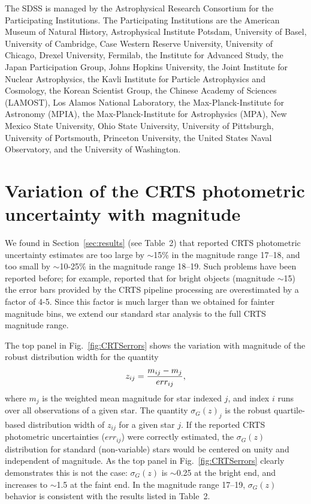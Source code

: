\documentclass[fleqn,usenatbib]{mnras}  %
\begin{document}
The SDSS is managed by the Astrophysical Research Consortium for the Participating Institutions. 
The Participating Institutions are the American Museum of Natural History, Astrophysical Institute 
Potsdam, University of Basel, University of Cambridge, Case Western Reserve University, University
of Chicago, Drexel University, Fermilab, the Institute for Advanced Study, the Japan Participation 
Group, Johns Hopkins University, the Joint Institute for Nuclear Astrophysics, the Kavli Institute for 
Particle Astrophysics and Cosmology, the Korean Scientist Group, the Chinese Academy of Sciences 
(LAMOST), Los Alamos National Laboratory, the Max-Planck-Institute for Astronomy (MPIA), the 
Max-Planck-Institute for Astrophysics (MPA), New Mexico State University, Ohio State University, 
University of Pittsburgh, University of Portsmouth, Princeton University, the United States Naval
Observatory, and the University of Washington. 




 


\appendix
\section{Variation of the CRTS photometric uncertainty with magnitude} 
\label{sec:appA}

We found in Section~\ref{sec:results} (see Table~2) that reported CRTS photometric uncertainty estimates 
are too large by $\sim$15\% in the magnitude range 17--18, and too small by $\sim$10-25\% in the 
magnitude range 18--19. Such problems have been reported before; for example, \cite{vaughan2016}
reported that for bright objects (magnitude $\sim$15) the error bars provided by the CRTS pipeline 
processing are overestimated by a factor of 4-5. Since this factor is much larger than we obtained
for fainter magnitude bins, we extend our standard star analysis to the full CRTS magnitude range. 

The top panel in Fig.~\ref{fig:CRTSerrors} shows the variation with magnitude of the robust distribution 
width for the quantity 
\begin{equation} 
\label{eq:z} 
           z_{ij} = { m_{ij} - m_j \over err_{ij} },
\end{equation}
where  $m_{j}$ is the weighted mean magnitude for star indexed $j$, and index $i$ runs over all
observations of a given star. The quantity $\sigma_G(z)_j$ is the robust quartile-based distribution 
width of $z_{ij}$ for a given star $j$. If the reported CRTS photometric uncertainties ($err_{ij}$) were 
correctly estimated, the $\sigma_G(z)$ distribution for standard (non-variable) stars would be 
centered on unity and independent of magnitude. As the  top panel in Fig.~\ref{fig:CRTSerrors} 
clearly demonstrates this is not the case: $\sigma_G(z)$ is $\sim$0.25 at the bright end, and 
increases to $\sim$1.5 at the faint end. In the magnitude range 17--19,  $\sigma_G(z)$ 
behavior is consistent with the results listed in Table~2. 
\end{document}
